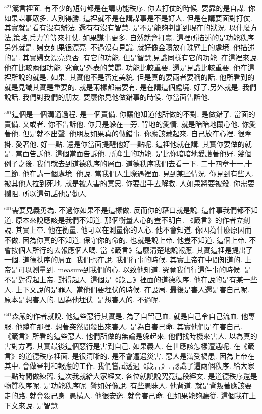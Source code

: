 \documentclass{book}
\begin{document}
$^{521}$箴言裡面.
有不少的短句都是在講功能秩序.
你去打仗的時候.
要靠的是自謀.
你如果謀事眾多.
人別得勝.
這裡就不是在講謀事是不是好人.
但是在講要面對打仗.
其實就是看有沒有辦法.
還有有沒有智慧.
是不是能夠判斷到現在的狀況.
以什麼方法,策略,兵力等等來打仗.
如果謀事更多.
自然就會打贏.
這裡所描述的是功能秩序.
另外就是.
婦女如果很漂亮.
不過沒有見識.
就好像金環放在珠臂上的處境.
他描述的是.
其實婦女漂亮與否.
有它的功能.
但是智慧,見識同樣有它的功能.
在這裡來說.
他在比較兩個功能.
究竟是外表的美麗.
功能比較重要.
還是見識比較重要.
他在這裡所說的就是.
如果.
其實他不是否定美貌.
但是真的要兩者要稱的話.
他所看到的就是見識其實是重要的.
就是兩樣都需要有.
是在講這個處境.
好了,另外就是.
我們說話.
我們對我們的朋友.
要麼你見他做錯事的時候.
你當面告訴他.

$^{561}$這個是一個溝通過程.
是一個責備.
你讓他知道他所做的不對.
是做錯了.
當面的責備.
又或者.
你不告訴他.
你只是躲在一旁.
背地的愛情.
就是暗暗地關心他.
你愛著他.
但是就不出聲.
他朋友如果真的做錯事.
你應該藏起來.
自己放在心裡.
很牽掛.
愛著他.
好一點.
還是你當面提醒他好一點呢.
這裡他就在講.
其實你要做的就是.
當面告訴他.
這個當面告訴他.
所產生的功能.
是比你暗暗地愛護著他好.
幾個例子之後.
我們就去到道德秩序的層面.
道德秩序我們去看一下.
二十四章十一,十二節.
他在講一個處境.
他說.
當我們人生際遇裡面.
見到某些情況.
你見到有些人.
被其他人拉到死地.
就是被人害的意思.
你要出手去解救.
人如果將要被殺.
你需要攔阻.
所以這句話他是勸人.

$^{601}$需要見義勇為.
不過你如果不是這樣做.
反而你的藉口就是說.
這件事我們都不知道.
原本來說應該是我們不知道.
那個衡量人心的豈不明白.
《箴言》的作者立刻說.
其實上帝.
他在衡量.
他可以在測量你的人心.
他不會知道.
你因為什麼原因而不做.
因為你真的不知道.
保守你的命的.
也就是說上帝.
他豈不知道.
這個上帝.
不會按個人所行的去報應個人嗎.
當《箴言》這麼清楚地說報應.
其實這裡是提出了一個.
道德秩序的層面.
我們也在說.
我們行事的時候.
其實上帝在中間知道的.
上帝是可以測量到.
measure到我們的心.
以致他知道.
究竟我們行這件事的時候.
是不是對得起上帝.
對得起人.
這個是《箴言》裡面的道德秩序.
他在說的是有某一些人.
上下文說的是罪人.
當他們要埋伏的時候.
在設局.
最後是害人還是害自己呢.
原本是想害人的.
因為他埋伏.
是想害人的.
不過呢.

$^{641}$森嚴的作者就說.
他這些惡行其實是.
為了自留己血.
就是自己令自己流血.
他專服.
他蹲在那裡.
想著突然間殺出來害人.
是為自害己命.
其實他們是在害自己.
《箴言》所看的這些惡人.
他們所做的無論是躲起來.
他們找時機來害人.
以為真的害對方嗎.
其實最後這個惡行是害到自己.
如果義人.
在世應該怎樣遭遇呢.
在《箴言》的道德秩序裡面.
是很清晰的.
是不會遭遇災害.
惡人是滿受禍患.
因為上帝在其中.
會做審判和報應的工作.
我們嘗試透過《箴言》.
認識了這兩個秩序.
給大家一點時間做練習.
這次我就給大家經文.
各位就說說究竟這段經文.
是道德秩序還是物質秩序呢.
是功能秩序呢.
譬如好像說.
有些愚昧人.
他背道.
就是背叛著應該要走的路.
就會殺己身.
愚橫人.
他很安逸.
就會害己命.
但如果能夠聽從.
這個我在上下文來說.
是智慧.
\end{document}
